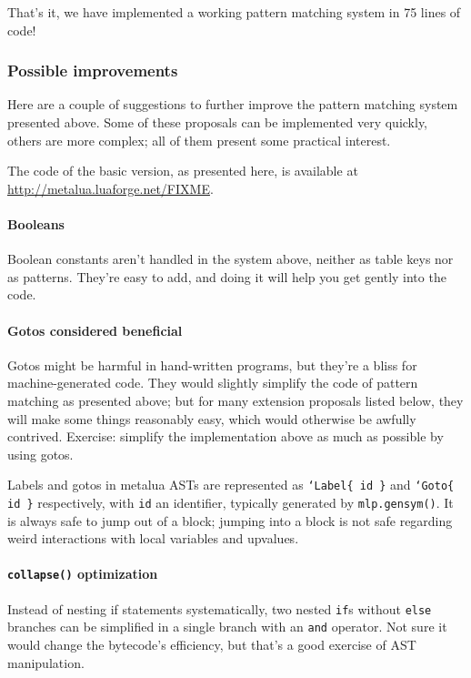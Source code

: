 \noindent That's it, we have implemented a working pattern
matching system in 75 lines of code!

\subsubsection{Possible improvements}
Here are a couple of suggestions to further improve the pattern
matching system presented above. Some of these proposals can be
implemented very quickly, others are more complex; all of them
present some practical interest.

The code of the basic version, as presented here, is available at
\url{http://metalua.luaforge.net/FIXME}.

\paragraph{Booleans} Boolean constants aren't handled in the system
above, neither as table keys nor as patterns. They're easy to add, and
doing it will help you get gently into the code.

\paragraph{Gotos considered beneficial} Gotos might be harmful in
hand-written programs, but they're a bliss for machine-generated
code. They would slightly simplify the code of pattern matching as
presented above; but for many extension proposals listed below, they
will make some things reasonably easy, which would otherwise be
awfully contrived. Exercise: simplify the implementation above as much
as possible by using gotos.

Labels and gotos in metalua ASTs are represented as {\tt`Label\{ id
  \}} and {\tt`Goto\{ id \}} respectively, with {\tt id} an
identifier, typically generated by {\tt mlp.gensym()}. It is always
safe to jump out of a block; jumping into a block is not safe
regarding weird interactions with local variables and upvalues.

\paragraph{{\tt collapse()} optimization} Instead of nesting if
statements systematically, two nested {\tt if}s without {\tt else}
branches can be simplified in a single branch with an {\tt and}
operator. Not sure it would change the bytecode's efficiency, but
that's a good exercise of AST manipulation.


